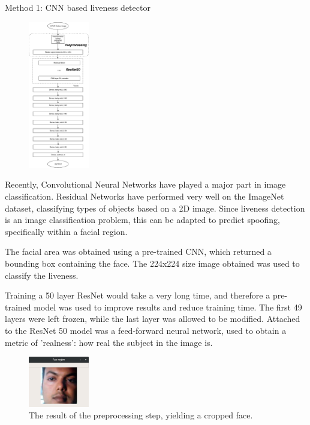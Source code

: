 \documentclass[final]{beamer}
\begin{document}
\begin{frame}{}
\begin{columns}[t]
\begin{column}{.48\linewidth}
        \begin{block}{Method 1: CNN based liveness detector}
          \begin{figure}
            \includegraphics[width=100px]{2DCNNArchitecture.pdf}
          \end{figure}
          Recently, Convolutional Neural Networks have played a major part in image classification. Residual Networks have performed very well on the ImageNet dataset, classifying types of objects based on a 2D image. Since liveness detection is an image classification problem, this can be adapted to predict spoofing, specifically within a facial region.
     
          The facial area was obtained using a pre-trained CNN, which returned a bounding box containing the face. The 224x224 size image obtained was used to classify the liveness.

          Training a 50 layer ResNet would take a very long time, and therefore a pre-trained model was used to improve results and reduce training time. The first 49 layers were left frozen, while the last layer was allowed to be modified. Attached to the ResNet 50 model was a feed-forward neural network, used to obtain a metric of 'realness': how real the subject in the image is.


          \begin{figure}
            \centering
            \includegraphics[width=100px]{FaceExtraction.png}
            \caption{The result of the preprocessing step, yielding a cropped face.}
          \end{figure}


\end{block}
\end{column}
\end{columns}
\end{frame}
\end{document}
